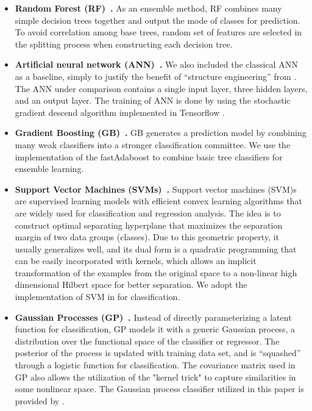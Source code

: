 \begin{itemize}
  \item
  \textbf{Random Forest (RF)~\cite{bib:liaw2002classification}.}
  As an ensemble method, RF combines many simple decision trees together and output the mode of classes for prediction.
  To avoid correlation among base trees, random set of features are selected in the splitting process when constructing each decision tree.

  \item
  \textbf{Artificial neural network (ANN)~\cite{bib:wang2003artificial}.}
  We also included the classical ANN as a baseline, simply to justify the benefit of ``structure engineering'' from \modelname.
  The ANN under comparison contains a single input layer, three hidden layers, and an output layer.
  The training of ANN is done by using the stochastic gradient descend algorithm implemented in Tensorflow \cite{bib:Tensorflow}.

  \item
  \textbf{Gradient Boosting (GB)~\cite{bib:friedman2002stochastic}.}
  GB generates a prediction model by combining many weak classifiers into a stronger classification committee.
  We use the implementation of the fastAdaboost \cite{bib:fastAdaboost} to combine basic tree classifiers for ensemble learning.

  \item
  \textbf{Support Vector Machines (SVMs)~\cite{bib:wang2005support}.}
  Support vector machines (SVM)s are supervised learning models with efficient convex learning algorithms that are widely used for classification and regression analysis.
  The idea is to construct optimal separating hyperplane that maximizes the separation margin of two data groups (classes).
  Due to this geometric property, it usually generalizes well, and its dual form is a quadratic programming that can be easily incorporated with kernels, which allows an implicit transformation of the examples from the original space to a non-linear high dimensional Hilbert space for better separation.
  We adopt the implementation of SVM in \cite{bib:scikit-learn} for classification.

  \item
  \textbf{Gaussian Processes (GP)~\cite{bib:rasmussen2006gaussian}.}
  Instead of directly parameterizing a latent function for classification, GP models it with a generic Gaussian process, \ie a distribution over the functional space of the classifier or regressor.
  The posterior of the process is updated with training data set, and is ``squashed'' through a logistic function for classification.
  The covariance matrix used in GP also allows the utilization of the "kernel trick" to capture similarities in some nonlinear space.
  The Gaussian process classifier utilized in this paper is provided by \cite{bib:scikit-learn}.


\end{itemize}
